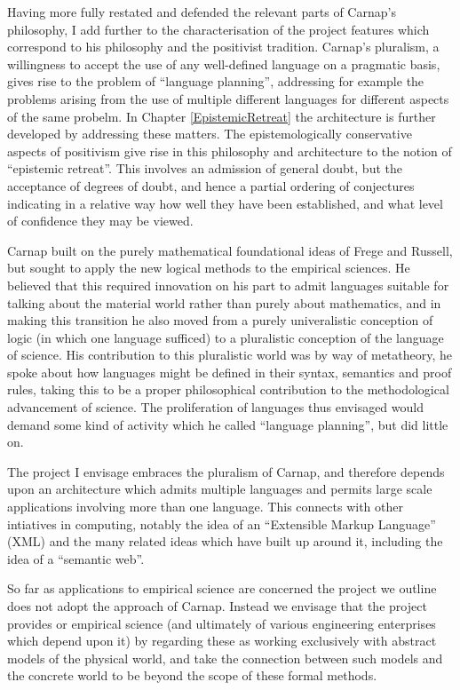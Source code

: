 Having more fully restated and defended the relevant parts of Carnap's
philosophy, I add further to the characterisation of the project
features which correspond to his philosophy and the positivist tradition.
Carnap's pluralism, a willingness to accept the use of any
well-defined language on a pragmatic basis, gives rise to the problem
of ``language planning'', addressing for example the problems arising
from the use of multiple different languages for different aspects of
the same probelm.
In Chapter \ref{EpistemicRetreat} the architecture is further
developed by addressing these matters.
The epistemologically conservative aspects of positivism give rise in
this philosophy and architecture to the notion of ``epistemic
retreat''.
This involves an admission of general doubt, but the acceptance of
degrees of doubt, and hence a partial ordering of conjectures
indicating in a relative way how well they have been established, and
what level of confidence they may be viewed.

Carnap built on the purely mathematical foundational ideas of Frege
and Russell, but sought to apply the new logical methods to the
empirical sciences.
He believed that this required innovation on his part to admit
languages suitable for talking about the material world rather than
purely about mathematics, and in making this transition he also moved
from a purely univeralistic conception of logic (in which one language
sufficed) to a pluralistic conception of the language of science.
His contribution to this pluralistic world was by way of metatheory,
he spoke about how languages might be defined in their syntax,
semantics and proof rules, taking this to be a proper philosophical
contribution to the methodological advancement of science.
The proliferation of languages thus envisaged would demand some kind
of activity which he called ``language planning'', but did little on.

The project I envisage embraces the pluralism of Carnap, and therefore
depends upon an architecture which admits multiple languages and
permits large scale applications involving more than one language.
This connects with other intiatives in computing, notably the idea of
an ``Extensible Markup Language'' (XML) and the many related ideas
which have built up around it, including the idea of a ``semantic web''.

So far as applications to empirical science are concerned the project
we outline does not adopt the approach of Carnap.
Instead we envisage that the project provides or empirical science
(and ultimately of various engineering enterprises which depend upon it)
by regarding these as working exclusively with abstract models of the
physical world, and take the connection between such models and the
concrete world to be beyond the scope of these formal methods.

